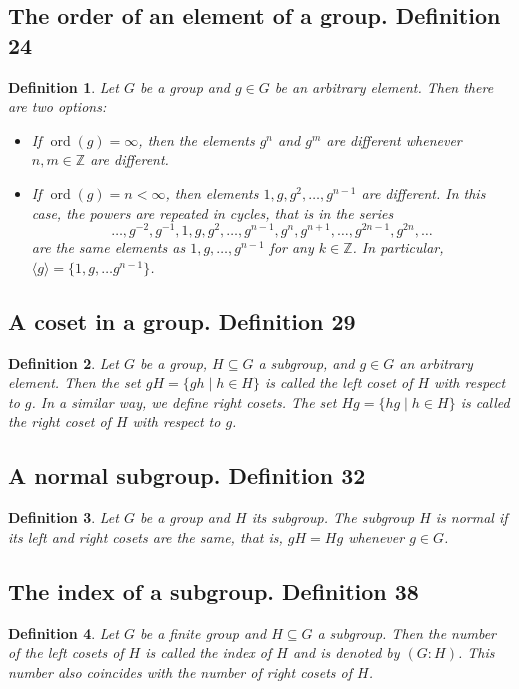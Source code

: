 \documentclass{article}
\newtheorem*{customdefinition}{Definition}
\begin{document}
\subsection*{The order of an element of a group. Definition 24}
\begin{customdefinition}
Let \( G \) be a group and \( g \in G \) be an arbitrary element. Then there are two options:
\begin{itemize}
    \item If \( \operatorname{ord}(g) = \infty \), then the elements \( g^n \) and \( g^m \) are different whenever \( n, m \in \mathbb{Z} \) are different.
    \item If \( \operatorname{ord}(g) = n < \infty \), then elements \( 1, g, g^2, \ldots, g^{n-1} \) are different. In this case, the powers are repeated in cycles, that is in the series
\[
\ldots, g^{-2}, g^{-1}, 1, g, g^2, \ldots, g^{n-1}, g^n, g^{n+1}, \ldots, g^{2n-1}, g^{2n}, \ldots
\]
are the same elements as \( 1, g, \ldots, g^{n-1} \) for any \( k \in \mathbb{Z} \). In particular, \( \langle g \rangle = \{1, g, \ldots g^{n-1}\} \).
\end{itemize}
\end{customdefinition}

\subsection*{A coset in a group. Definition 29}
\begin{customdefinition}
Let \( G \) be a group, \( H \subseteq G \) a subgroup, and \( g \in G \) an arbitrary element. Then the set \( gH = \{gh \mid h \in H\} \) is called the left coset of \( H \) with respect to \( g \). In a similar way, we define right cosets. The set \( Hg = \{hg \mid h \in H\} \) is called the right coset of \( H \) with respect to \( g \).
\end{customdefinition}



\subsection*{A normal subgroup. Definition 32}
\begin{customdefinition}
Let \( G \) be a group and \( H \) its subgroup. The subgroup \( H \) is normal if its left and right cosets are the same, that is, \( gH = Hg \) whenever \( g \in G \).
\end{customdefinition}

\subsection*{The index of a subgroup. Definition 38}
\begin{customdefinition}
Let \( G \) be a finite group and \( H \subseteq G \) a subgroup. Then the number of the left cosets of \( H \) is called the index of \( H \) and is denoted by \( (G : H) \). This number also coincides with the number of right cosets of \( H \).
\end{customdefinition}
\end{document}
